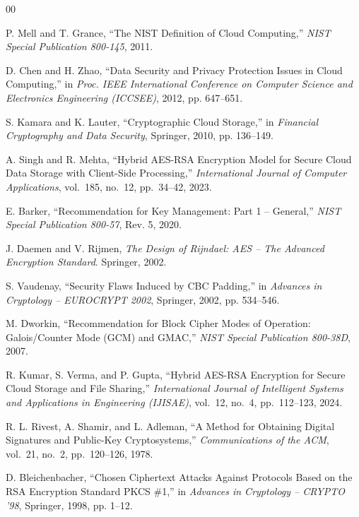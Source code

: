 \documentclass[conference]{IEEEtran}
\begin{document}
\begin{thebibliography}{00}

P. Mell and T. Grance, ``The NIST Definition of Cloud Computing,'' \textit{NIST Special Publication 800-145}, 2011.

D. Chen and H. Zhao, ``Data Security and Privacy Protection Issues in Cloud Computing,'' in \textit{Proc. IEEE International Conference on Computer Science and Electronics Engineering (ICCSEE)}, 2012, pp. 647--651.

S. Kamara and K. Lauter, ``Cryptographic Cloud Storage,'' in \textit{Financial Cryptography and Data Security}, Springer, 2010, pp. 136--149.

A. Singh and R. Mehta, ``Hybrid AES-RSA Encryption Model for Secure Cloud Data Storage with Client-Side Processing,'' \textit{International Journal of Computer Applications}, vol.~185, no.~12, pp.~34--42, 2023.

E. Barker, ``Recommendation for Key Management: Part 1 -- General,'' \textit{NIST Special Publication 800-57}, Rev. 5, 2020.

J. Daemen and V. Rijmen, \textit{The Design of Rijndael: AES -- The Advanced Encryption Standard}. Springer, 2002.

S. Vaudenay, ``Security Flaws Induced by CBC Padding,'' in \textit{Advances in Cryptology -- EUROCRYPT 2002}, Springer, 2002, pp. 534--546.

M. Dworkin, ``Recommendation for Block Cipher Modes of Operation: Galois/Counter Mode (GCM) and GMAC,'' \textit{NIST Special Publication 800-38D}, 2007.

R. Kumar, S. Verma, and P. Gupta, ``Hybrid AES-RSA Encryption for Secure Cloud Storage and File Sharing,'' \textit{International Journal of Intelligent Systems and Applications in Engineering (IJISAE)}, vol.~12, no.~4, pp.~112--123, 2024.

R. L. Rivest, A. Shamir, and L. Adleman, ``A Method for Obtaining Digital Signatures and Public-Key Cryptosystems,'' \textit{Communications of the ACM}, vol.~21, no.~2, pp.~120--126, 1978.

D. Bleichenbacher, ``Chosen Ciphertext Attacks Against Protocols Based on the RSA Encryption Standard PKCS \#1,'' in \textit{Advances in Cryptology -- CRYPTO '98}, Springer, 1998, pp. 1--12.


\end{thebibliography}
\end{document}
